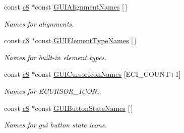 \begin{DoxyCompactItemize}
\item 
\mbox{\label{namespaceirr_1_1gui_a356f87c7a79af136d7128f4cf2a3ad9a}} 
const \hyperlink{namespaceirr_a9395eaea339bcb546b319e9c96bf7410}{c8} $\ast$const \hyperlink{namespaceirr_1_1gui_a356f87c7a79af136d7128f4cf2a3ad9a}{G\+U\+I\+Alignment\+Names} \mbox{[}$\,$\mbox{]}
\begin{DoxyCompactList}\small\item\em Names for alignments. \end{DoxyCompactList}\item 
\mbox{\label{namespaceirr_1_1gui_afd5c3c406438f3b6df63b9c53c0464e3}} 
const \hyperlink{namespaceirr_a9395eaea339bcb546b319e9c96bf7410}{c8} $\ast$const \hyperlink{namespaceirr_1_1gui_afd5c3c406438f3b6df63b9c53c0464e3}{G\+U\+I\+Element\+Type\+Names} \mbox{[}$\,$\mbox{]}
\begin{DoxyCompactList}\small\item\em Names for built-\/in element types. \end{DoxyCompactList}\item 
\mbox{\label{namespaceirr_1_1gui_a33bd57d04dbf92750f64a244df85cd51}} 
const \hyperlink{namespaceirr_a9395eaea339bcb546b319e9c96bf7410}{c8} $\ast$const \hyperlink{namespaceirr_1_1gui_a33bd57d04dbf92750f64a244df85cd51}{G\+U\+I\+Cursor\+Icon\+Names} \mbox{[}E\+C\+I\+\_\+\+C\+O\+U\+NT+1\mbox{]}
\begin{DoxyCompactList}\small\item\em Names for E\+C\+U\+R\+S\+O\+R\+\_\+\+I\+C\+ON. \end{DoxyCompactList}\item 
\mbox{\label{namespaceirr_1_1gui_a4c9022b413a54ce6ce5f665b252080d7}} 
const \hyperlink{namespaceirr_a9395eaea339bcb546b319e9c96bf7410}{c8} $\ast$const \hyperlink{namespaceirr_1_1gui_a4c9022b413a54ce6ce5f665b252080d7}{G\+U\+I\+Button\+State\+Names} \mbox{[}$\,$\mbox{]}
\begin{DoxyCompactList}\small\item\em Names for gui button state icons. \end{DoxyCompactList}\item 
\mbox{\label{namespaceirr_1_1gui_a83bb2d39d73bd6827e9c6e0ee9265b02}} 

\end{DoxyCompactItemize}
